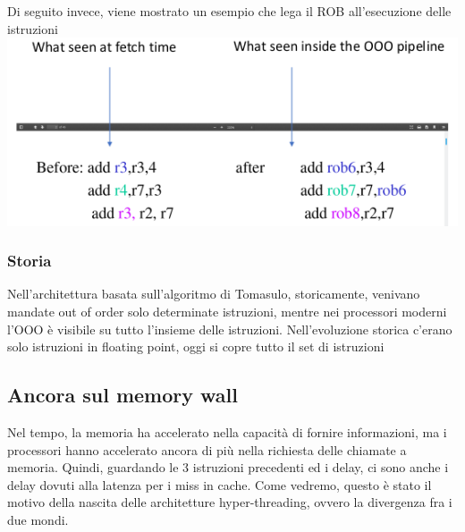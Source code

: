 \documentclass[14pt, oneside]{book}
\begin{document}
\newpage
Di seguito invece, viene mostrato un esempio che lega il ROB all'esecuzione delle istruzioni\\
\includegraphics[scale=0.6]{immagini/rob}
\subsubsection{Storia}
Nell'architettura basata sull'algoritmo di Tomasulo, storicamente, venivano mandate out of order solo determinate istruzioni, mentre nei processori moderni l'OOO è visibile su tutto l'insieme delle istruzioni. Nell'evoluzione storica c'erano solo istruzioni in floating point, oggi si copre tutto il set di istruzioni
\subsection{Ancora sul memory wall}
Nel tempo, la memoria ha accelerato nella capacità di fornire informazioni, ma i processori hanno accelerato ancora di più nella richiesta delle chiamate a memoria. Quindi, guardando le 3 istruzioni precedenti ed i delay, ci sono anche i delay dovuti alla latenza per i miss in cache. Come vedremo, questo è stato il motivo della nascita delle architetture hyper-threading, ovvero la divergenza fra i due mondi.
\end{document}
